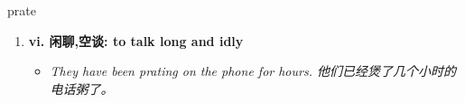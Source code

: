 
\begin{frame}
{\huge prate}
\begin{center}
\begin{enumerate}\Large
  \item \textbf{vi. 闲聊,空谈: to talk long and idly}
  \begin{itemize}
    \item \em{\Large{They have been prating on the phone for hours. 他们已经煲了几个小时的电话粥了。}}
  \end{itemize}
\end{enumerate}
\end{center}
\end{frame}
